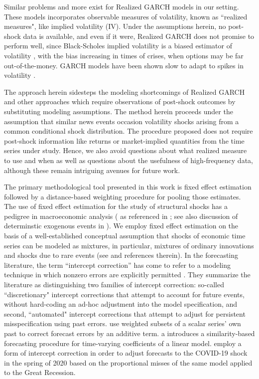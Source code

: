 \documentclass[11pt,3p,review,authoryear]{elsarticle}
\theoremstyle{definition}
\begin{document}
Similar problems and more exist for Realized GARCH models \citep{hansen2012realized} in our setting. These models incorporates observable measures of volatility, known as  ``realized measures", like implied volatility (IV). Under the assumptions herein, no post-shock data is available, and even if it were, Realized GARCH does not promise to perform well, since Black-Scholes implied volatility is a biased estimator of volatility \citep{mayhew1995implied, christensen1998relation}, with the bias increasing in times of crises, when options may be far out-of-the-money.  GARCH models have been shown slow to adapt to spikes in volatility \citep{andersen2003modeling}.

The approach herein sidesteps the modeling shortcomings of Realized GARCH and other approaches which require observations of post-shock outcomes
by substituting modeling assumptions.  The method herein proceeds under the assumption that similar news events occasion volatility shocks arising from a common conditional shock distribution.  The procedure proposed does not require post-shock information like returns or market-implied quantities from the time series under study.  Hence, we also avoid questions about what realized measure to use and when as well as questions about the usefulness of high-frequency data, although these remain intriguing avenues for future work.

The primary methodological tool presented in this work is fixed effect estimation followed by a distance-based weighting procedure for pooling those estimates.  The use of fixed effect estimation for the study of structural shocks has a pedigree in macroeconomic analysis (\citet{romer1989does} as referenced in \citet{kilian2017structural}; see also discussion of determinstic exogenous events in \citet{engle2001good}).  We employ fixed effect estimation on the basis of a well-established conceptual assumption that shocks of economic time series can be modeled as mixtures, in particular, mixtures of ordinary innovations and shocks due to rare events (see \cite{phillips1996forecasting} and references therein).  In the forecasting literature, the term ``intercept correction'' has come to refer to a modeling technique in which nonzero errors are explicitly permitted \citep{hendry1994theory, clements1998forecasting}.  They summarize the literature as distinguishing two families of intercept correction: so-called ``discretionary" intercept corrections that attempt to account for future events, without hard-coding an ad-hoc adjustment into the model specification, and second, ``automated" intercept corrections that attempt to adjust for persistent misspecification using past errors.  \citet{guerron2017macroeconomic} use weighted subsets of a scalar series' own past to correct forecast errors by an additive term. \citet{dendramis2020similarity} a introduces a similarity-based forecasting procedure for time-varying coefficients of a linear model. \citet{foroni2022forecasting} employ a form of intercept correction in order to adjust forecasts to the COVID-19 shock in the spring of 2020 based on the proportional misses of the same model applied to the Great Recession.
\end{document}
